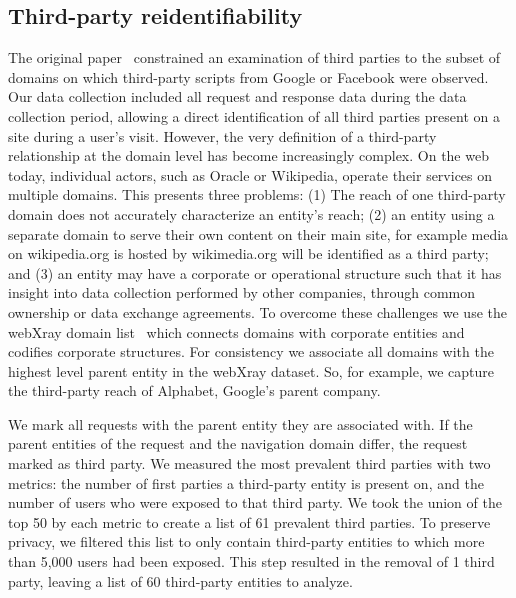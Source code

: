 \documentclass[letterpaper,twocolumn,10pt]{article}
\begin{document}
\subsection{Third-party reidentifiability}
\label{ssec:ext-third-parties}
The original paper~\cite{olejnikWhyJohnnyCan2012} constrained an examination of third parties to the subset of domains on which third-party scripts from Google or Facebook were observed.
Our data collection included all request and response data during the data collection period, allowing a direct identification of all third parties present on a site during a user's visit.
However, the very definition of a third-party relationship at the domain level has become increasingly complex. 
On the web today, individual actors, such as Oracle or Wikipedia, operate their services on multiple domains.
This presents three problems: (1) The reach of one third-party domain does not accurately characterize an entity's reach; (2) an entity using a separate domain to serve their own content on their main site, for example media on wikipedia.org is hosted by wikimedia.org will be identified as a third party; and (3) an entity may have a corporate or operational structure such that it has insight into data collection performed by other companies, through common ownership or data exchange agreements.
To overcome these challenges we use the webXray domain list~\cite{Libery-Web-xray, TimlibWebXrayDomain} which connects domains with corporate entities and codifies corporate structures.
For consistency we associate all domains with the highest level parent entity in the webXray dataset.
So, for example, we capture the third-party reach of Alphabet, Google's parent company.

We mark all requests with the parent entity they are associated with. If the parent entities of the request and the navigation domain differ, the request marked as third party.
We measured the most prevalent third parties with two metrics: the number of first parties a third-party entity is present on, and the number of users who were exposed to that third party.
We took the union of the top 50 by each metric to create a list of 61 prevalent third parties. 
To preserve privacy, we filtered this list to only contain third-party entities to which more than 5,000 users had been exposed.
This step resulted in the removal of 1 third party, leaving a list of 60 third-party entities to analyze.
\end{document}

